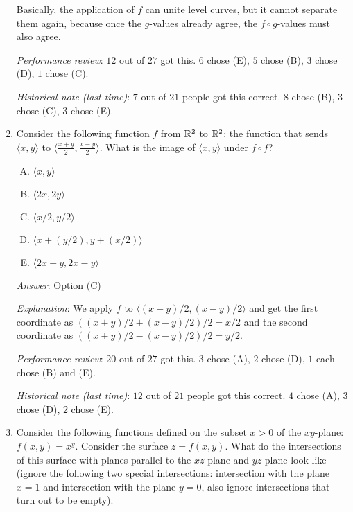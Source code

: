 \documentclass[10pt]{amsart}
\begin{document}
\begin{enumerate}
  Basically, the application of $f$ can unite level curves, but it
  cannot separate them again, because once the $g$-values already
  agree, the $f \circ g$-values must also agree.

  {\em Performance review}: $12$ out of $27$ got this. $6$ chose (E),
  $5$ chose (B), $3$ chose (D), $1$ chose (C).

  {\em Historical note (last time)}: $7$ out of $21$ people got this
  correct. $8$ chose (B), $3$ chose (C), $3$ chose (E).

\item Consider the following function $f$ from $\mathbb{R}^2$ to $\mathbb{R}^2$: the
  function that sends $\langle x,y \rangle$ to $\langle \frac{x +
  y}{2}, \frac{x - y}{2} \rangle$. What is the image of $\langle x,y
  \rangle$ under $f \circ f$?

  \begin{enumerate}[(A)]
  \item $\langle x,y \rangle$
  \item $\langle 2x,2y \rangle$
  \item $\langle x/2,y/2 \rangle$
  \item $\langle x + (y/2), y + (x/2) \rangle$
  \item $\langle 2x + y, 2x - y \rangle$
  \end{enumerate}
  
  {\em Answer}: Option (C)

  {\em Explanation}: We apply $f$ to $\langle (x + y)/2, (x - y)/2
  \rangle$ and get the first coordinate as $((x + y)/2 + (x - y)/2)/2
  = x/2$ and the second coordinate as $((x + y)/2 - (x - y)/2)/2 =
  y/2$.

  {\em Performance review}: $20$ out of $27$ got this. $3$ chose (A),
  $2$ chose (D), $1$ each chose (B) and (E).

  {\em Historical note (last time)}: $12$ out of $21$ people got this
  correct. $4$ chose (A), $3$ chose (D), $2$ chose (E).

\item Consider the following functions defined on the subset $x > 0$
  of the $xy$-plane: $f(x,y) = x^y$. Consider the surface $z =
  f(x,y)$. What do the intersections of this surface with planes
  parallel to the $xz$-plane and $yz$-plane look like (ignore the
  following two special intersections: intersection with the plane $x
  = 1$ and intersection with the plane $y = 0$, also ignore
  intersections that turn out to be empty).


\end{enumerate}
\end{document}
